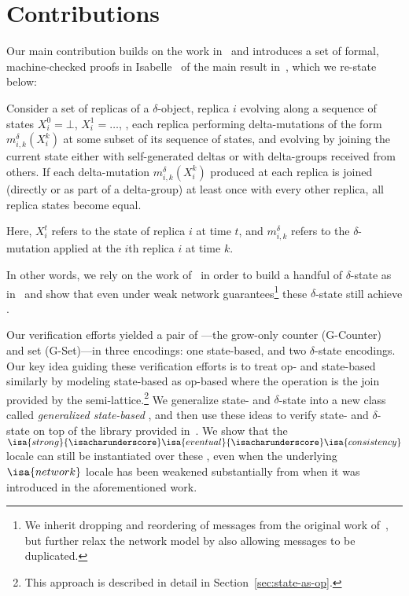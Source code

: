 \section{Contributions}

Our main contribution builds on the work in~\citet{gomes17} and introduces a set
of formal, machine-checked proofs in Isabelle~\citep{wenzel02} of the main
result in~\citet{almedia18}, which we re-state below:

\begin{theorem}
  Consider a set of replicas of a $\delta$-\CRDT object, replica $i$ evolving
  along a sequence of states $X_i^0 = \bot$, $X_i^1=\ldots$, , each replica
  performing delta-mutations of the form $m^\delta_{i,k}(X^k_i)$ at some subset
  of its sequence of states, and evolving by joining the current state either
  with self-generated deltas or with delta-groups received from others. If each
  delta-mutation $m^\delta _{i,k}(X^k_i)$ produced at each replica is joined
  (directly or as part of a delta-group) at least once with every other replica,
  all replica states become equal.
\end{theorem}

Here, $X_i^t$ refers to the state of replica $i$ at time $t$, and
$m^\delta_{i,k}$ refers to the $\delta$-mutation applied at the $i$th replica
$i$ at time $k$.

In other words, we rely on the work of~\citet{gomes17} in order to build a
handful of $\delta$-state \CRDTs as in~\citet{almedia18} and show that even
under weak network guarantees\footnote{We inherit dropping and reordering of
messages from the original work of~\citet{gomes17}, but further relax the
network model by also allowing messages to be duplicated.} these $\delta$-state
\CRDTs still achieve \SEC.

Our verification efforts yielded a pair of \CRDTs---the grow-only counter
(G-Counter) and set (G-Set)---in three encodings: one state-based, and two
$\delta$-state encodings. Our key idea guiding these verification efforts is to
treat op- and state-based \CRDTs similarly by modeling state-based \CRDTs as
op-based where the operation is the join provided by the
semi-lattice.\footnote{This approach is described in detail in
Section~\ref{sec:state-as-op}.} We generalize state- and $\delta$-state \CRDTs
into a new class called \emph{generalized state-based \CRDTs}, and then use
these ideas to verify state- and $\delta$-state \CRDTs on top of the library
provided in~\citet{gomes17}.  We show that the
$\isa{strong}{\isacharunderscore}\isa{eventual}{\isacharunderscore}\isa{consistency}$
locale can still be instantiated over these \CRDTs, even when the underlying
$\isa{network}$ locale has been weakened substantially from when it was
introduced in the aforementioned work.

